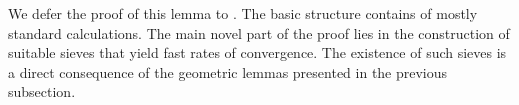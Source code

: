 \documentclass[MSNbibl,number,citesort]{arxbj}
\def\comment{}
\newcommand{\Dcal}{\mathcal{D}}
\newcommand{\Kcal}{\mathcal{K}}
\newcommand{\TPlan}{\mathcal{T}}
\newcommand{\Wr}{W_r}
\begin{document}
We defer the proof of this lemma to %
\cite{Nguyen-hdpsupp}.
The basic structure contains of mostly standard calculations.
The main novel part of
the proof lies in the construction of suitable sieves that yield fast rates
of convergence. The existence of such sieves is a direct
consequence of the geometric lemmas presented in the previous
subsection.

%
%
%
%
\end{document}
